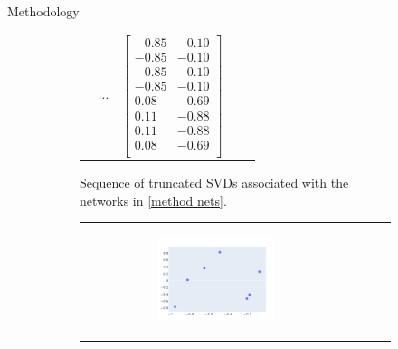 \documentclass[12pt]{amsbook}
\begin{document}
\begin{chapter}{Methodology}
\begin{figure}[H]
\begin{subfigure}[c]{1\textwidth}
\begin{tabular}{m{} m{} m{} m{} l}
                &
                $\cdots$
                &
                
                    $\begin{bmatrix}
                        -0.85 &  -0.10\\
                        -0.85 &  -0.10\\
                        -0.85 &  -0.10\\
                        -0.85 &  -0.10\\
                         0.08 &  -0.69\\
                         0.11 &  -0.88\\
                         0.11 &  -0.88\\
                         0.08 &  -0.69\\
                    \end{bmatrix}$
                \end{tabular}
                \caption{Sequence of truncated SVDs associated with the networks in \cref{method nets}.}
                \label{method embed}
            \end{subfigure}
            
            \begin{subfigure}[c]{1\textwidth}
                \begin{tabular}{llll}
                \begin{subfigure}[c]{0.31\textwidth}
                    \centering
                    \begin{subfigure}[p]{1\textwidth}
                        \includegraphics[width=\linewidth]{../Code/Plots/examples/plot 1.png}
                        

\end{subfigure}
\end{subfigure}
\end{tabular}
\end{subfigure}
\end{figure}
\end{chapter}
\end{document}
